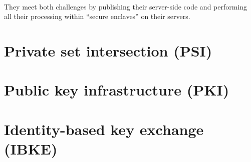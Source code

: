 \paragraph{} They meet both challenges by publishing their server-side code and performing all their processing within ``secure enclaves'' on their servers.


\section{Private set intersection (PSI)}
\label{sec:PSI}



\section{Public key infrastructure (PKI)}
\label{sec:PKI}


\section{Identity-based key exchange (IBKE)}
\label{sec:IBKE}